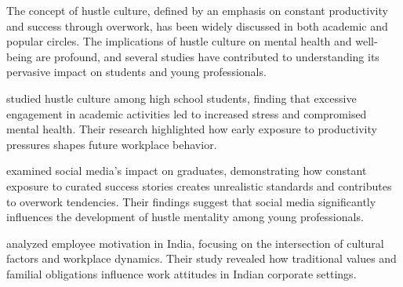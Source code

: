 The concept of hustle culture, defined by an emphasis on constant productivity and success through overwork, has been widely discussed in both academic and popular circles. The implications of hustle culture on mental health and well-being are profound, and several studies have contributed to understanding its pervasive impact on students and young professionals.

\textcite{maharani2024prevalence} studied hustle culture among high school students, finding that excessive engagement in academic activities led to increased stress and compromised mental health. Their research highlighted how early exposure to productivity pressures shapes future workplace behavior.

\textcite{Tian2024} examined social media's impact on graduates, demonstrating how constant exposure to curated success stories creates unrealistic standards and contributes to overwork tendencies. Their findings suggest that social media significantly influences the development of hustle mentality among young professionals.

\textcite{Arora2021} analyzed employee motivation in India, focusing on the intersection of cultural factors and workplace dynamics. Their study revealed how traditional values and familial obligations influence work attitudes in Indian corporate settings.

